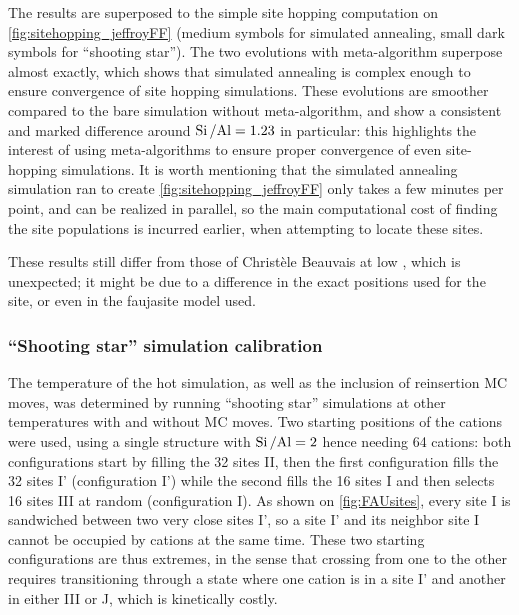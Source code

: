 \documentclass[main.tex]{subfiles}
\begin{document}
The results are superposed to the simple site hopping computation on \cref{fig:sitehopping_jeffroyFF} (medium symbols for simulated annealing, small dark symbols for ``shooting star''). The two evolutions with meta-algorithm superpose almost exactly, which shows that simulated annealing is complex enough to ensure convergence of site hopping simulations. These evolutions are smoother compared to the bare simulation without meta-algorithm, and show a consistent and marked difference around $\mbox{Si\,/Al} = 1.23$ in particular: this highlights the interest of using meta-algorithms to ensure proper convergence of even site-hopping simulations. It is worth mentioning that the simulated annealing simulation ran to create \cref{fig:sitehopping_jeffroyFF} only takes a few minutes per point, and can be realized in parallel, so the main computational cost of finding the site populations is incurred earlier, when attempting to locate these sites.

These results still differ from those of Christèle Beauvais at low \SiAl, which is unexpected; it might be due to a difference in the exact positions used for the site, or even in the faujasite model used.

\subsubsection{``Shooting star'' simulation calibration}

The temperature of the hot simulation, as well as the inclusion of reinsertion MC moves, was determined by running ``shooting star'' simulations at other temperatures with and without MC moves. Two starting positions of the cations were used, using a single structure with $\mbox{Si\,/Al} = 2$ hence needing 64 cations: both configurations start by filling the 32 sites II, then the first configuration fills the 32 sites I' (configuration I') while the second fills the 16 sites I and then selects 16 sites III at random (configuration I). As shown on \cref{fig:FAUsites}, every site I is sandwiched between two very close sites I', so a site I' and its neighbor site I cannot be occupied by cations at the same time. These two starting configurations are thus extremes, in the sense that crossing from one to the other requires transitioning through a state where one cation is in a site I' and another in either III or J, which is kinetically costly.
\end{document}
